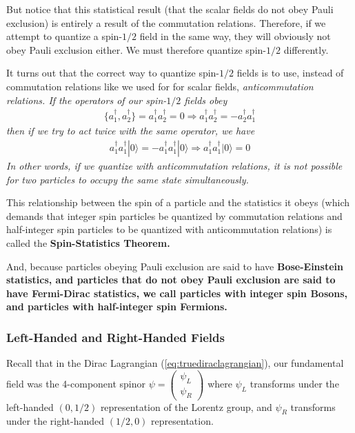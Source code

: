 \documentclass[12pt,epsf]{article}
\def\nolabel{\nonumber }
\def\nolabel{\nonumber }
\begin{document}
But notice that this statistical result (that the scalar fields do not
obey Pauli exclusion) is entirely a result of the commutation
relations.  Therefore, if we attempt to quantize a spin-$1/2$ field in
the same way, they will obviously not obey Pauli exclusion either.  We
must therefore quantize spin-$1/2$ differently.  

It turns out that the correct way to quantize spin-$1/2$ fields is to
use, instead of commutation relations like we used for for scalar
fields, \it anticommutation relations\rm.  If the operators of our
spin-$1/2$ fields obey
\begin{eqnarray}
\{a^{\dagger}_1,a^{\dagger}_2\} = a^{\dagger}_1a^{\dagger}_2 = 0
\Rightarrow a^{\dagger}_1 a^{\dagger}_2 =
-a^{\dagger}_2a^{\dagger}_1\nolabel
\end{eqnarray}
then if we try to act twice with the same operator, we have 
\begin{eqnarray}
a^{\dagger}_1a^{\dagger}_1|0\rangle = -a^{\dagger}_1a^{\dagger}_1
|0\rangle \Rightarrow a^{\dagger}_1a^{\dagger}_1|0\rangle = 0\nolabel
\end{eqnarray}
In other words, if we quantize with anticommutation relations, it is
not possible for two particles to occupy the same state simultaneously. 

This relationship between the spin of a particle and the statistics it
obeys (which demands that integer spin particles be quantized by
commutation relations and half-integer spin particles to be quantized
with anticommutation relations) is called the \bf Spin-Statistics
Theorem\rm.  

And, because particles obeying Pauli exclusion are said to have \bf
Bose-Einstein \rm statistics, and particles that do not obey Pauli
exclusion are said to have \bf Fermi-Dirac \rm statistics, we call
particles with integer spin \bf Bosons\rm, and particles with
half-integer spin \bf Fermions\rm.  

\subsubsection{Left-Handed and Right-Handed Fields}
\label{sec:leftright}

Recall that in the Dirac Lagrangian (\ref{eq:truediraclagrangian}), our
fundamental field was the 4-component spinor $\psi = 
\begin{pmatrix}
\psi_L \\ \psi_R
\end{pmatrix}$ where $\psi_L$ transforms under the left-handed
$(0,1/2)$ representation of the Lorentz group, and $\psi_R$ transforms
under the right-handed $(1/2,0)$ representation.  
\end{document}
